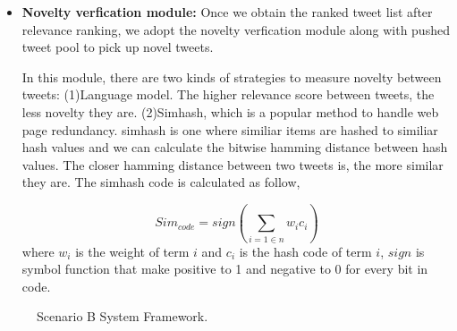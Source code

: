 \begin{itemize}
\item \textbf{Novelty verfication module:} Once we obtain the ranked tweet list after relevance ranking, we adopt the novelty verfication module along with pushed tweet pool to pick up novel tweets.


In this module, there are two kinds of strategies to measure novelty between tweets: (1)Language model. The higher relevance score between tweets, the less novelty they are. (2)Simhash\cite{charikar2002similarity}, which is a popular method to handle web page redundancy. simhash is one where similiar items are hashed to similiar hash values and we can calculate the bitwise hamming distance between hash values. The closer hamming distance between two tweets is, the more similar they are. The simhash code is calculated as follow,

\begin{equation}
\label{equ:lm}
Sim_{code} = sign(\sum_{i=1 \in n} w_{i} c_{i})
\end{equation}
where $w_{i}$ is the weight of term $i$ and $c_{i}$ is the hash code of term $i$, $sign$ is symbol function that make positive to 1 and negative to 0 for every bit in code.

\end{itemize}

\begin{figure}[htbp]
\centering
{
}
\caption{Scenario B System Framework.}
\label{fig:Bsys}
\end{figure}



